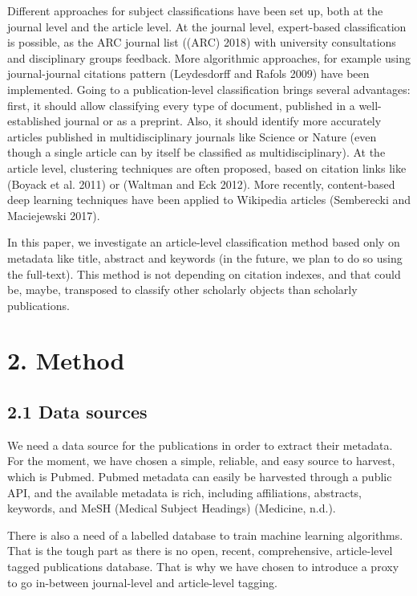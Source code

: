 \documentclass[
]{article}
\begin{document}
Different approaches for subject classifications have been set up, both
at the journal level and the article level. At the journal level,
expert-based classification is possible, as the ARC journal list ((ARC)
2018) with university consultations and disciplinary groups feedback.
More algorithmic approaches, for example using journal-journal citations
pattern (Leydesdorff and Rafols 2009) have been implemented. Going to a
publication-level classification brings several advantages: first, it
should allow classifying every type of document, published in a
well-established journal or as a preprint. Also, it should identify more
accurately articles published in multidisciplinary journals like Science
or Nature (even though a single article can by itself be classified as
multidisciplinary). At the article level, clustering techniques are
often proposed, based on citation links like (Boyack et al. 2011) or
(Waltman and Eck 2012). More recently, content-based deep learning
techniques have been applied to Wikipedia articles (Semberecki and
Maciejewski 2017).

In this paper, we investigate an article-level classification method
based only on metadata like title, abstract and keywords (in the future,
we plan to do so using the full-text). This method is not depending on
citation indexes, and that could be, maybe, transposed to classify other
scholarly objects than scholarly publications.

\hypertarget{method}{%
\section{2. Method}\label{method}}

\hypertarget{data-sources}{%
\subsection{2.1 Data sources}\label{data-sources}}

We need a data source for the publications in order to extract their
metadata. For the moment, we have chosen a simple, reliable, and easy
source to harvest, which is Pubmed. Pubmed metadata can easily be
harvested through a public API, and the available metadata is rich,
including affiliations, abstracts, keywords, and MeSH (Medical Subject
Headings) (Medicine, n.d.).

There is also a need of a labelled database to train machine learning
algorithms. That is the tough part as there is no open, recent,
comprehensive, article-level tagged publications database. That is why
we have chosen to introduce a proxy to go in-between journal-level and
article-level tagging.
\end{document}

